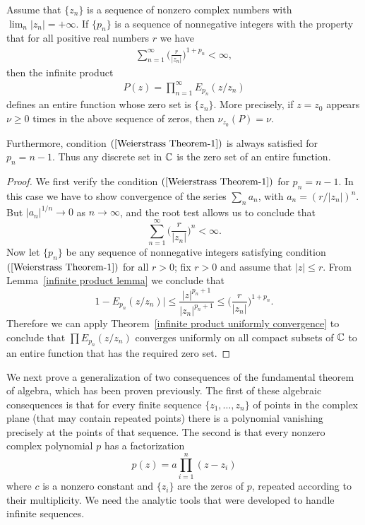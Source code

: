 \begin{theorem}
Assume that $\{z_n\}$ is a sequence of nonzero complex numbers with $\lim_n|z_n|=+\infty$. If $\{p_n\}$ is a sequence of nonnegative integers with the property that for all positive real numbers $r$ we have
\begin{align}\label{Weierstrass Theorem-1}
\sum_{n=1}^{\infty}\Big(\frac{r}{|z_n|}\Big)^{1+p_n}<\infty,
\end{align}
then the infinite product
\begin{align}\label{Weierstrass Theorem-2}
P(z)=\prod_{n=1}^{\infty}E_{p_n}(z/z_n)
\end{align}
defines an entire function whose zero set is $\{z_n\}$. More precisely, if $z=z_0$ appears $\nu\geq 0$ times in the above sequence of zeros, then $\nu_{z_0}(P)=\nu$.\par
Furthermore, condition $(\ref{Weierstrass Theorem-1})$ is always satisfied for $p_n=n-1$. Thus any discrete set in $\mathbb{C}$ is the zero set of an entire function.
\end{theorem}
\begin{proof}
We first verify the condition $(\ref{Weierstrass Theorem-1})$ for $p_n=n-1$. In this case we have to show convergence of the series $\sum_na_n$, with $a_n=(r/|z_n|)^{n}$. But $|a_n|^{1/n}\to 0$ as $n\to\infty$, and the root test allows us to conclude that
\[\sum_{n=1}^{\infty}\Big(\frac{r}{|z_n|}\Big)^n<\infty.\]
Now let $\{p_n\}$ be any sequence of nonnegative integers satisfying condition $(\ref{Weierstrass Theorem-1})$ for all $r>0$; fix $r>0$ and assume that $|z|\leq r$. From Lemma~\ref{infinite product lemma} we conclude that
\[1-E_{p_n}(z/z_n)|\leq\frac{|z|^{p_n+1}}{|z_n|^{p_n+1}}\leq\Big(\frac{r}{|z_n|}\Big)^{1+p_n}.\]
Therefore we can apply Theorem~\ref{infinite product uniformly convergence} to conclude that $\prod E_{p_n}(z/z_n)$ converges uniformly on all compact subsets of $\mathbb{C}$ to an entire function that has the required zero set.
\end{proof}
We next prove a generalization of two consequences of the fundamental theorem of algebra, which has been proven previously. The first of these algebraic consequences is that for every finite sequence $\{z_1,\dots,z_n\}$ of points in the complex plane (that may contain repeated points) there is a polynomial vanishing precisely at the points of that sequence. The second is that every nonzero complex polynomial $p$ has a factorization
\[p(z)=a\prod_{i=1}^{n}(z-z_i)\]
where $c$ is a nonzero constant and $\{z_i\}$ are the zeros of $p$, repeated according to their multiplicity. We need the analytic tools that were developed to handle infinite sequences.
